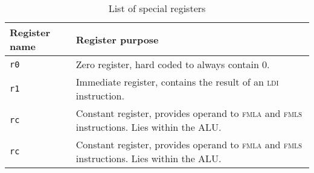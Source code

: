 \begin{table}[H]
	\centering
	\begin{tabular}{|l p{10.5cm}|}
		\hline
		\textbf{Register name} & \textbf{Register purpose} \\
		\hline
		\texttt{r0} & Zero register, hard coded to always contain 0.\\
		\texttt{r1} & Immediate register, contains the result of an \textsc{ldi} instruction.\\
		\texttt{rc} & Constant register, provides operand to \textsc{fmla} and \textsc{fmls} instructions. Lies within the ALU. \\
		\texttt{rc} & Constant register, provides operand to \textsc{fmla} and \textsc{fmls} instructions. Lies within the ALU. \\
		\hline
	\end{tabular}
	\caption{List of special registers}
	\label{tab:specregs}
\end{table}
